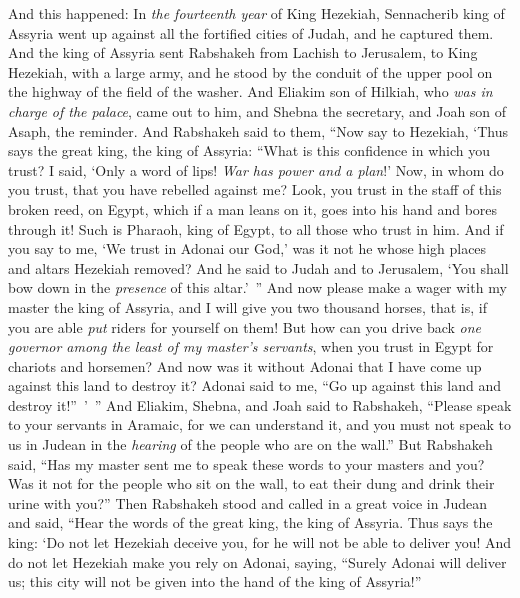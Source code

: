 \begin{biblechapter} %
 And this happened: In \textit{the fourteenth year} of King Hezekiah, Sennacherib king of Assyria went up against all the fortified cities of Judah, and he captured them.
\verse And the king of Assyria sent Rabshakeh from Lachish to Jerusalem, to King Hezekiah, with a large army, and he stood by the conduit of the upper pool on the highway of the field of the washer.
\verse And Eliakim son of Hilkiah, who \textit{was in charge of the palace}, came out to him, and Shebna the secretary, and Joah son of Asaph, the reminder.
\verse And Rabshakeh said to them, “Now say to Hezekiah, ‘Thus says the great king, the king of Assyria: “What is this confidence in which you trust?
\verse I said, ‘Only a word of lips! \textit{War has power and a plan}!’ Now, in whom do you trust, that you have rebelled against me?
\verse Look, you trust in the staff of this broken reed, on Egypt, which if a man leans on it, goes into his hand and bores through it! Such is Pharaoh, king of Egypt, to all those who trust in him.
\verse And if you say to me, ‘We trust in Adonai our God,’ was it not he whose high places and altars Hezekiah removed? And he said to Judah and to Jerusalem, ‘You shall bow down in the \textit{presence} of this altar.’ ”
\verse And now please make a wager with my master the king of Assyria, and I will give you two thousand horses, that is, if you are able \textit{put} riders for yourself on them!
\verse But how can you drive back \textit{one governor among the least of my master’s servants}, when you trust in Egypt for chariots and horsemen?
\verse And now was it without Adonai that I have come up against this land to destroy it? Adonai said to me, “Go up against this land and destroy it!” ’ ”
\verse And Eliakim, Shebna, and Joah said to Rabshakeh, “Please speak to your servants in Aramaic, for we can understand it, and you must not speak to us in Judean in the \textit{hearing} of the people who are on the wall.”
\verse But Rabshakeh said, “Has my master sent me to speak these words to your masters and you? Was it not for the people who sit on the wall, to eat their dung and drink their urine with you?”
\verse Then Rabshakeh stood and called in a great voice in Judean and said, “Hear the words of the great king, the king of Assyria.
\verse Thus says the king: ‘Do not let Hezekiah deceive you, for he will not be able to deliver you!
\verse And do not let Hezekiah make you rely on Adonai, saying, “Surely Adonai will deliver us; this city will not be given into the hand of the king of Assyria!”

\end{biblechapter}
